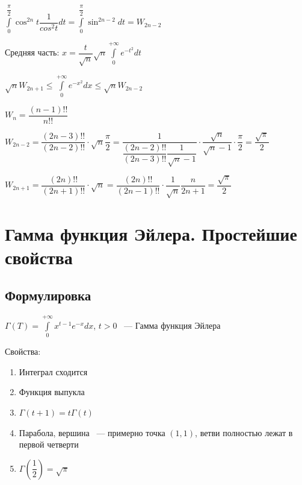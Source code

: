 \documentclass{article}
\begin{document}
            $\int\limits^{\dfrac{\pi}{2}}_0 \cos^{2n} t \dfrac{1}{cos^2 t} dt = \int\limits^{\dfrac{\pi}{2}}_0 \sin^{2n - 2} dt = W_{2n - 2}$
            
            Средняя часть: $x = \dfrac{t}{\sqrt{n}} \sqrt{n} \int\limits^{+\infty}_0 e^{-t^2} dt$
            
            $\sqrt{n} W_{2n + 1} \leq \int\limits^{+\infty}_0 e^{-x^2} dx \leq \sqrt{n} W_{2n - 2}$
            
            $W_n = \dfrac{(n - 1)!!}{n!!}$
            
            $W_{2n - 2} = \dfrac{(2n - 3)!!}{(2n - 2)!!} \cdot \sqrt{n} \dfrac{\pi}{2} = \dfrac{1}{\dfrac{(2n - 2)!!}{(2n - 3)!!} \dfrac{1}{\sqrt{n} - 1}} \cdot \dfrac{\sqrt{n}}{\sqrt{n} - 1} \cdot \dfrac{\pi}{2} = \dfrac{\sqrt{\pi}}{2}$
            
            $W_{2n + 1} = \dfrac{(2n)!!}{(2n + 1)!!} \cdot \sqrt{n} = \dfrac{(2n)!!}{(2n - 1)!!} \cdot \dfrac{1}{\sqrt{n}} \dfrac{n}{2n + 1} = \dfrac{\sqrt{\pi}}{2}$
            
            
    \newpage
    
    \section{Гамма функция Эйлера. Простейшие свойства}
    
        \subsection{Формулировка}
        
            $\Gamma(T) = \int\limits^{+\infty}_0 x^{t - 1} e^{-x} dx$, $t > 0$ ~--- Гамма функция Эйлера
            
            Свойства:
            
            \begin{enumerate}
            
                \item Интеграл сходится
                
                \item Функция выпукла
                
                \item $\Gamma(t + 1) = t \Gamma (t)$
                
                \item Парабола, вершина ~--- примерно точка $(1, 1)$, ветви полностью лежат в первой четверти
                
                \item $\Gamma \left( \dfrac{1}{2} \right) = \sqrt{\pi}$
                
            \end{enumerate}
            
\end{document}
